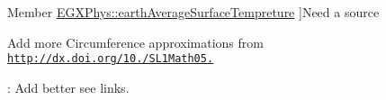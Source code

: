 \begin{DoxyRefList}
%
Member \mbox{\hyperlink{group___e_g_x_phys-_constants-_astrophysics-_solar_system-_earth-_bulk_ga850a2031af18dbe83cafae87542b588d}{E\+G\+X\+Phys\+:\+:earth\+Average\+Surface\+Tempreture}} ]Need a source  
\item[\label{todo__todo000010}%
\Hypertarget{todo__todo000010}%
File \mbox{\hyperlink{_ellipse_circumference_8hpp}{Ellipse\+Circumference.hpp}} ]Add more Circumference approximations from \href{http://dx.doi.org/10.3247/SL1Math05.004}{\tt http\+://dx.\+doi.\+org/10./\+S\+L1\+Math05.}  
\item[\label{todo__todo000007}%
\Hypertarget{todo__todo000007}%
File \mbox{\hyperlink{_nuclear_separation_energy_8hpp}{Nuclear\+Separation\+Energy.hpp}} ]\+: Add better see links. 
\end{DoxyRefList}